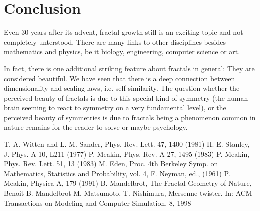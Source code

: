 \documentclass[twocolumn,10pt]{scrartcl}
\begin{document}
    \section{Conclusion}
        Even 30 years after its advent, fractal growth still is an exciting topic and not completely unterstood.
        There are many links to other disciplines besides mathematics and physics, be it biology, engineering,
        computer science or art.

        In fact, there is one additional striking feature about fractals in general: They are considered beautiful. We
        have seen that there is a deep connection between dimensionality and scaling laws, i.e. self-similarity. The
        question whether the perceived beauty of fractals is due to this special kind of symmetry (the human brain
        seeming to react to symmetry on a very fundamental level), or the perceived beauty of symmetries is due to
        fractals being a phenomenon common in nature remains for the reader to solve or maybe psychology.

    \begin{thebibliography}{99}
         T. A. Witten and L. M. Sander, Phys. Rev. Lett. 47, 1400 (1981)
         H. E. Stanley, J. Phys. A 10, L211 (1977)
         P. Meakin, Phys. Rev. A 27, 1495 (1983)
         P. Meakin, Phys. Rev. Lett. 51, 13 (1983)
         M. Eden, Proc. 4th Berkeley Symp. on Mathematics, Statistics and Probability, vol. 4,
            F. Neyman, ed., (1961)
         P. Meakin, Physica A, 179 (1991)
         B. Mandelbrot, The Fractal Geometry of Nature, Benoit B. Mandelbrot
        M. Matsumoto, T. Nishimura, Mersenne twister. In: ACM Transactions on Modeling and
          Computer Simulation. 8, 1998
    \end{thebibliography}
\end{document}
